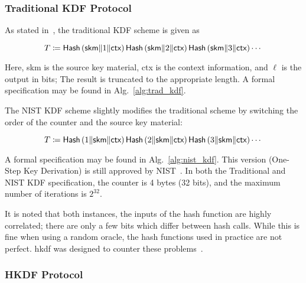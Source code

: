\subsubsection{Traditional KDF Protocol}

As stated in~\cite[Section 8]{HKDF2010},
the traditional KDF scheme is given as

\begin{equation}
    T \coloneqq{} \textsf{Hash}\left( \textsf{skm}\|1\|\textsf{ctx} \right)
                 \textsf{Hash}\left( \textsf{skm}\|2\|\textsf{ctx} \right)
                 \textsf{Hash}\left( \textsf{skm}\|3\|\textsf{ctx} \right)\cdots
\end{equation}

\noindent
Here, \textsf{skm} is the source key material,
\textsf{ctx} is the context information, and $\ell$ is the output in bits;
The result is truncated to the appropriate length.
A formal specification may be found in Alg.~\ref{alg:trad_kdf}.



The NIST KDF scheme slightly modifies the traditional scheme
by switching the order of the counter and the source key material:

\begin{equation}
    T \coloneqq{} \textsf{Hash}\left( 1\|\textsf{skm}\|\textsf{ctx} \right)
                 \textsf{Hash}\left( 2\|\textsf{skm}\|\textsf{ctx} \right)
                 \textsf{Hash}\left( 3\|\textsf{skm}\|\textsf{ctx} \right)\cdots
\end{equation}

\noindent
A formal specification may be found in Alg.~\ref{alg:nist_kdf}.
This version (One-Step Key Derivation) is still approved by
NIST~\cite[Section 4]{NIST-SP-800-56Cr2}.
In both the Traditional and NIST KDF specification,
the counter is 4 bytes (32 bits),
and the maximum number of iterations is $2^{32}$.



It is noted that both instances,
the inputs of the hash function are highly correlated;
there are only a few bits which differ between hash calls.
While this is fine when using a \gls{random oracle},
the \glspl{hash function} used in practice are not perfect.
\Gls{hkdf} was designed to counter these problems~\cite{HKDF2010}.


\subsubsection{HKDF Protocol}

